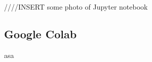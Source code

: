 ////INSERT some photo of Jupyter notebook


\subsection{Google Colab}
asa






























